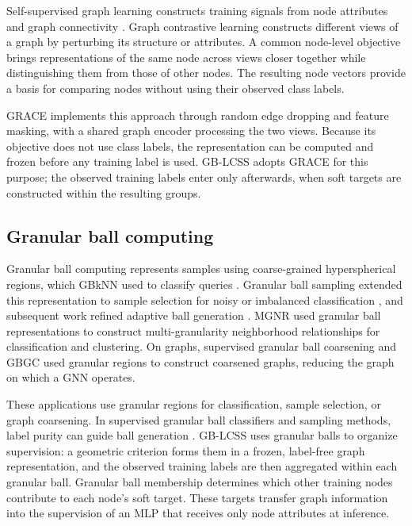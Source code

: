 \documentclass[10pt,letterpaper,nopreprintline]{elsarticle}
\theoremstyle{plain}
\begin{document}
Self-supervised graph learning constructs training signals from node attributes and graph connectivity \cite{ref57}. Graph contrastive learning constructs different views of a graph by perturbing its structure or attributes. A common node-level objective brings representations of the same node across views closer together while distinguishing them from those of other nodes. The resulting node vectors provide a basis for comparing nodes without using their observed class labels.

GRACE \cite{ref12} implements this approach through random edge dropping and feature masking, with a shared graph encoder processing the two views. Because its objective does not use class labels, the representation can be computed and frozen before any training label is used. GB-LCSS adopts GRACE for this purpose; the observed training labels enter only afterwards, when soft targets are constructed within the resulting groups.

\subsection{Granular ball computing}\label{sec:2.5}

Granular ball computing represents samples using coarse-grained hyperspherical regions, which GBkNN used to classify queries \cite{ref13}. Granular ball sampling extended this representation to sample selection for noisy or imbalanced classification \cite{ref15}, and subsequent work refined adaptive ball generation \cite{ref16}. MGNR \cite{ref58} used granular ball representations to construct multi-granularity neighborhood relationships for classification and clustering. On graphs, supervised granular ball coarsening \cite{ref66} and GBGC \cite{ref67} used granular regions to construct coarsened graphs, reducing the graph on which a GNN operates.

These applications use granular regions for classification, sample selection, or graph coarsening. In supervised granular ball classifiers and sampling methods, label purity can guide ball generation \cite{ref13,ref15,ref16}. GB-LCSS uses granular balls to organize supervision: a geometric criterion forms them in a frozen, label-free graph representation, and the observed training labels are then aggregated within each granular ball. Granular ball membership determines which other training nodes contribute to each node's soft target. These targets transfer graph information into the supervision of an MLP that receives only node attributes at inference.
\end{document}
